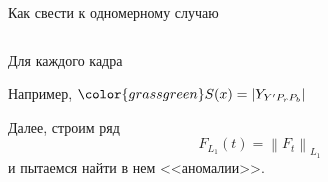 \begin{frame}{Как свести к одномерному случаю}
\begin{small}
\begin{columns}[t]
\begin{column}{0.5\textwidth}
\begin{orange-box}{Для каждого кадра}
\[            \]
        \end{orange-box}
        \begin{footnotesize}
            \begin{green-box}{\unskip}
                \textcolor{grassgreen}{
                    Например, \quad 
                    $\color{grassgreen} S(x) = |Y_{Y'P_rP_b}| $
                }
            \end{green-box}
            \begin{orange-box}{\unskip}
                Далее, строим ряд
                \[
                    F_{L_{1}}(t) = \left\| F_{t} \right\|_{L_1} 
                \]
                и пытаемся найти в нем <<аномалии>>.
            \end{orange-box}
        \end{footnotesize}
    \end{column}
\end{columns}
\end{small}

\end{frame}
